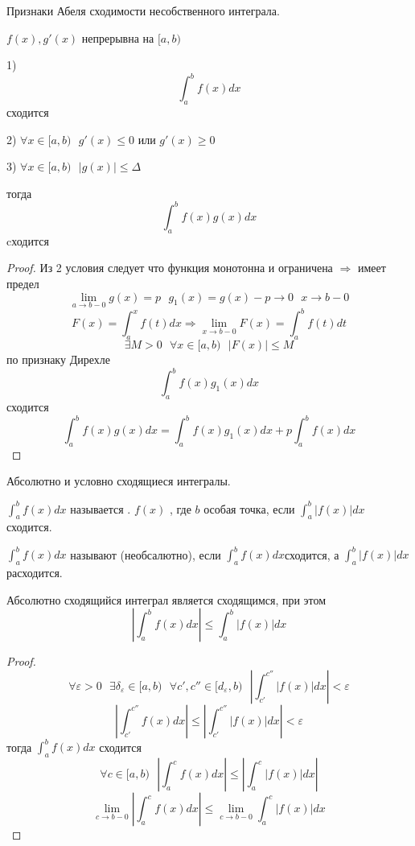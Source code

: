 \begin{title}[\Large]
  Признаки Абеля сходимости несобственного интеграла.
\end{title}

\begin{block}[Признак]
  $f(x),g'(x)$ непрерывна на $[a,b)$

  1) $$\int_a^b f(x)dx$$ сходится

  2) $\forall x \in [a,b) ~~~ g'(x) \le 0$ или $g'(x) \ge 0$

  3) $\forall x \in [a,b) ~~~ |g(x)| \le \Delta$

  тогда
  $$
  \int_a^b f(x)g(x)dx
  $$
  cходится
\end{block}

\begin{proof}
  Из 2 условия следует что функция монотонна и ограничена $\Rightarrow$ имеет
  предел
  $$
  \lim_{a \to b-0}g(x) = p ~~~ g_1(x) = g(x) - p \to 0 ~~~ x \to b-0
  $$
  $$
  F(x) = \int_a^x f(t)dx \Rightarrow \lim_{x \to b-0} F(x) = \int_a^b f(t)dt
  $$
  $$
  \exists M > 0 ~~~ \forall x \in [a,b) ~~~ |F(x)| \le M
  $$
  по признаку Дирехле
  $$
  \int_a^b f(x)g_1(x)dx
  $$
  сходится
  $$
  \int_a^b f(x)g(x)dx = \int_a^b f(x)g_1(x)dx + p\int_a^b f(x)dx
  $$
\end{proof}

\begin{title}[\Large]
  Абсолютно и условно сходящиеся интегралы.
\end{title}

\begin{defin}
  $\int_a^b f(x)dx$ называется . $f(x)$ , где $b$ особая точка, если $\int_a^b |f(x)|dx$ сходится.
\end{defin}

\begin{defin}
  $\int_a^b f(x)dx$ называют  (необсалютно), если
  $\int_a^b f(x)dx$сходится, а $\int_a^b |f(x)|dx$ расходится.
\end{defin}

\begin{theorem}
  Абсолютно сходящийся интеграл является сходящимся, при этом
  $$
  \left| \int_a^b f(x)dx \right| \le \int_a^b |f(x)|dx
  $$
\end{theorem}

\begin{proof}
  $$
  \forall \varepsilon > 0 ~~~ \exists \delta_{\varepsilon} \in [a,b) ~~~
  \forall c',c'' \in [d_{\varepsilon}, b) ~~~
  \left| \int_{c'}^{c''} |f(x)|dx \right| < \varepsilon
  $$
  $$
  \left| \int_{c'}^{c''} f(x)dx \right| \le
  \left| \int_{c'}^{c''} |f(x)|dx \right| < \varepsilon
  $$
  тогда $\int_a^b f(x) dx$ сходится
  $$
  \forall c \in [a,b) ~~~ \left| \int_a^c f(x)dx \right| \le
  \left| \int_a^c |f(x)|dx \right|
  $$
  $$
  \lim_{c \to b-0} \left| \int_a^{c} f(x)dx \right| \le
  \lim_{c \to b-0} \int_a^c |f(x)|dx
  $$
\end{proof}

